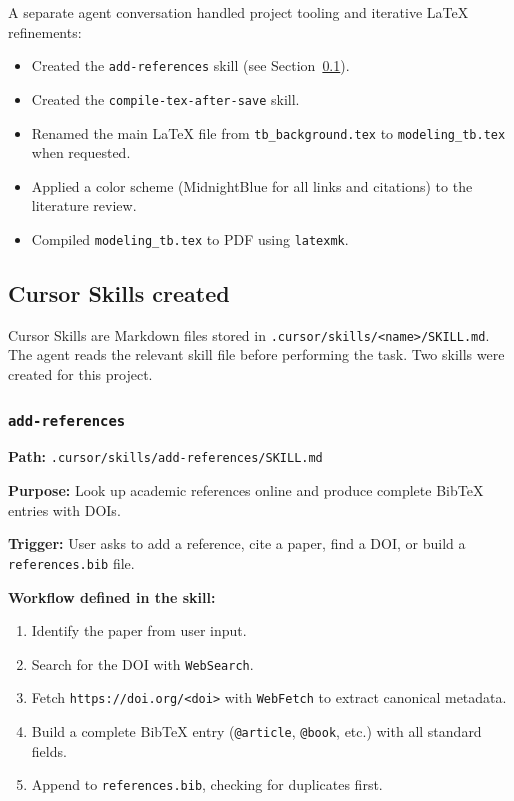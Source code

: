 \documentclass[11pt]{article}
\begin{document}
A separate agent conversation handled project tooling and iterative LaTeX refinements:
\begin{itemize}[noitemsep]
  \item Created the \texttt{add-references} skill (see Section~\ref{sec:skills}).
  \item Created the \texttt{compile-tex-after-save} skill.
  \item Renamed the main \LaTeX{} file from \texttt{tb\_background.tex} to \texttt{modeling\_tb.tex} when requested.
  \item Applied a color scheme (MidnightBlue for all links and citations) to the literature review.
  \item Compiled \texttt{modeling\_tb.tex} to PDF using \texttt{latexmk}.
\end{itemize}

\subsection{Cursor Skills created}
\label{sec:skills}

Cursor Skills are Markdown files stored in \texttt{.cursor/skills/<name>/SKILL.md}. The agent reads the relevant skill file before performing the task. Two skills were created for this project.

\subsubsection{\texttt{add-references}}

\textbf{Path:} \texttt{.cursor/skills/add-references/SKILL.md}

\textbf{Purpose:} Look up academic references online and produce complete BibTeX entries with DOIs.

\textbf{Trigger:} User asks to add a reference, cite a paper, find a DOI, or build a \texttt{references.bib} file.

\textbf{Workflow defined in the skill:}
\begin{enumerate}[noitemsep]
  \item Identify the paper from user input.
  \item Search for the DOI with \texttt{WebSearch}.
  \item Fetch \texttt{https://doi.org/<doi>} with \texttt{WebFetch} to extract canonical metadata.
  \item Build a complete BibTeX entry (\texttt{@article}, \texttt{@book}, etc.) with all standard fields.
  \item Append to \texttt{references.bib}, checking for duplicates first.
\end{enumerate}
\end{document}
